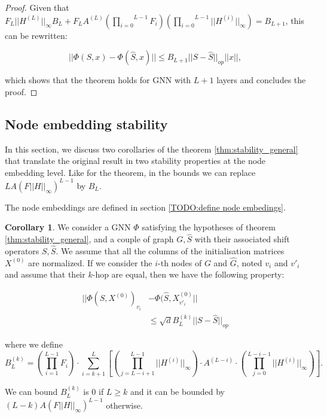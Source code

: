 \documentclass[11pt,a4paper]{article}
\newcommand{\op}[1]{|| #1 ||_{op}}
\newcommand{\ninf}[1]{|| #1 ||_\infty}
\newcommand{\Sum}[2]{\overset{#2}{\underset{#1}{\sum}}}
\newcommand{\Prod}[2]{\overset{#2}{\underset{#1}{\prod}}}
\theoremstyle{definition}
\newtheorem{corollary}{Corollary}[theorem]
\renewcommand{\leq}{\leqslant}
\begin{document}
\begin{proof}
            Given that $F_L \ninf{H^{(L)}} B_L + F_L A^{(L)} \left( \Prod{i=0}{L-1} F_i \right) \left( \Prod{i=0}{L-1} \ninf{H^{(i)}} \right) = B_{L+1}$, this can be rewritten:

            \begin{equation}
                || \Phi (S,x) - \Phi (\hat{S},x) || \leq B_{L+1} \op{S - \hat{S}} ||x||,
            \end{equation}

            which shows that the theorem holds for GNN with $L+1$ layers and concludes the proof.

        \end{proof}



   \subsection{Node embedding stability}

    In this section, we discuss two corollaries of the theorem \ref{thm:stability_general} that translate the original result in two stability properties at the node embedding level. Like for the theorem, in the bounds we can replace $L A (F \ninf{H})^{L-1} $ by $B_L$. 
    
    The node embeddings are defined in section \ref{TODO:define node embedings}.

    \begin{corollary}
    \label{cor:k-hop_node_stability}
    We consider a GNN $\Phi$ satisfying the hypotheses of theorem \ref{thm:stability_general}, and a couple of graph $G,\hat{S}$ with their associated shift operators $S,\hat{S}$. We assume that all the columns of the initialisation matrices $X^{(0)}$ are normalized. If we consider the $i$-th nodes of $G$ and $\hat{G}$, noted $v_i$ and $v'_i$ and assume that their $k$-hop are equal, then we have the following property:
    
    \begin{align}
        || \Phi(S, X^{(0)})_{v_i} &- \Phi(\hat{S}, X ^{(0)}_{v'_i}|| \nonumber \\
        &\leq \sqrt{d} B_L^{(k)} \op{S - \hat{S}}
        \label{eq:k-hop_node_stab}
    \end{align}

    where we define $$ B_L^{(k)} = \left( \Prod{i=1}{L-1} F_i \right)  \cdot \Sum{i=k+1}{L} \left[ (\underset{j=L-i+1}{\overset{L-1}{\prod}} \ninf{H ^{(i)}}) \cdot A^{(L-i)} \cdot (\underset{j=0}{\overset{L-i-1}{\prod}} \ninf{H ^{(i)}}) \right].$$ 

    We can bound $B_L^{(k)}$ is $0$ if $L \geq k$ and it can be bounded by $(L-k) A (F \ninf{H})^{L-1}$ otherwise.

    \end{corollary}
\end{document}
